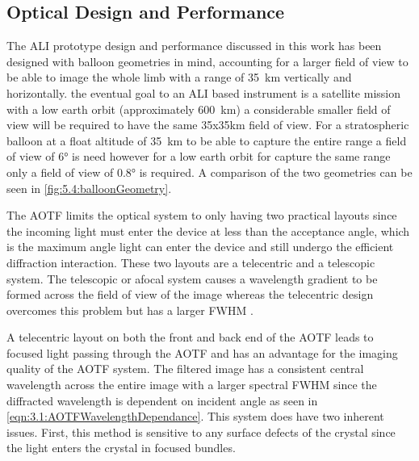\documentclass[12pt]{article}
\begin{document}
\subsection{Optical Design and Performance}

The ALI prototype design and performance discussed in this work has been designed with balloon geometries in mind, accounting for a larger field of view to be able to image the whole limb with a range of 35~km vertically and horizontally. the eventual goal to an ALI based instrument is a satellite mission with a low earth orbit (approximately 600~km) a considerable smaller field of view will be required to have the same 35x35km field of view. For a stratospheric balloon at a float altitude of 35~km to be able to capture the entire range a field of view of 6\si{\degree} is need however for a low earth orbit for capture the same range only a field of view of 0.8\si{\degree} is required. A comparison of the two geometries can be seen in \autoref{fig:5.4:balloonGeometry}.

The AOTF limits the optical system to only having two practical layouts since the incoming light must enter the device at less than the acceptance angle, which is the maximum angle light can enter the device and still undergo the efficient diffraction interaction. These two layouts are a telecentric and a telescopic system. The telescopic or afocal system causes a wavelength gradient to be formed across the field of view of the image whereas the telecentric design overcomes this problem but has a larger FWHM \citep{Suhre2004}.

A telecentric layout on both the front and back end of the AOTF leads to focused light passing through the AOTF and has an advantage for the imaging quality of the AOTF system. The filtered image has a consistent central wavelength across the entire image with a larger spectral FWHM since the diffracted wavelength is dependent on incident angle as seen in \autoref{eqn:3.1:AOTFWavelengthDependance}. This system does have two inherent issues. First, this method is sensitive to any surface defects of the crystal since the light enters the crystal in focused bundles.
\end{document}
